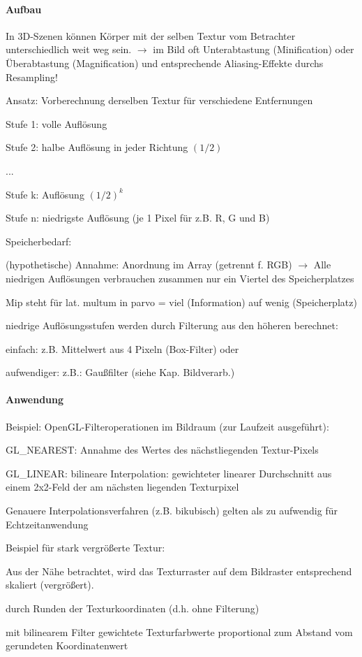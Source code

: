 \documentclass[landscape]{article}
\begin{document}
\begin{multicols}{3}
  
  \paragraph{Aufbau}
  \begin{itemize*}
    \item In 3D-Szenen können Körper mit der selben Textur vom Betrachter unterschiedlich weit weg sein. $\rightarrow$ im Bild oft Unterabtastung (Minification) oder Überabtastung (Magnification) und entsprechende Aliasing-Effekte durchs Resampling!
    \item Ansatz: Vorberechnung derselben Textur für verschiedene Entfernungen
    \item Stufe 1: volle Auflösung
    \item Stufe 2: halbe Auflösung in jeder Richtung $(1/2)$
    \item ...
    \item Stufe k: Auflösung $(1/2)^k$
    \item Stufe n: niedrigste Auflösung (je 1 Pixel für z.B. R, G und B)
    \item Speicherbedarf:
    \item (hypothetische) Annahme: Anordnung im Array (getrennt f. RGB) $\rightarrow$ Alle niedrigen Auflösungen verbrauchen zusammen nur ein Viertel des Speicherplatzes
    \item Mip steht für lat. multum in parvo = viel (Information) auf wenig (Speicherplatz)
    \item niedrige Auflösungsstufen werden durch Filterung aus den höheren berechnet:
    \item einfach: z.B. Mittelwert aus 4 Pixeln (Box-Filter) oder
    \item aufwendiger: z.B.: Gaußfilter (siehe Kap. Bildverarb.)
  \end{itemize*}
  
  \paragraph{Anwendung}
  \begin{itemize*}
    \item Beispiel: OpenGL-Filteroperationen im Bildraum (zur Laufzeit ausgeführt):
    \item GL\_NEAREST: Annahme des Wertes des nächstliegenden Textur-Pixels
    \item GL\_LINEAR: bilineare Interpolation: gewichteter linearer Durchschnitt aus einem 2x2-Feld der am nächsten liegenden Texturpixel
    \item Genauere Interpolationsverfahren (z.B. bikubisch) gelten als zu aufwendig für Echtzeitanwendung
    \item Beispiel für stark vergrößerte Textur:
    \item Aus der Nähe betrachtet, wird das Texturraster auf dem Bildraster entsprechend skaliert (vergrößert).
    \item durch Runden der Texturkoordinaten (d.h. ohne Filterung)
    \item mit bilinearem Filter gewichtete Texturfarbwerte proportional zum Abstand vom gerundeten Koordinatenwert
  \end{itemize*}
  

\end{multicols}
\end{document}
